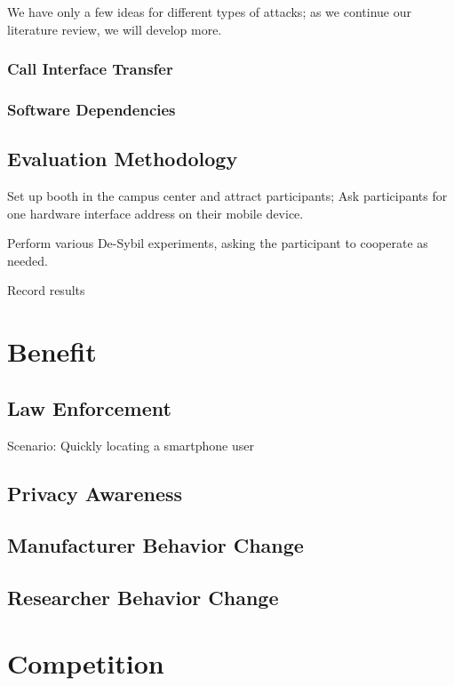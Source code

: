 \documentclass{article}
\begin{document}
			We have only a few ideas for different types of attacks; as we
			continue our literature review, we will develop more.
			\subsubsection{Call Interface Transfer}
			\subsubsection{Software Dependencies}
		\subsection{Evaluation Methodology}
			Set up booth in the campus center and attract participants; Ask
			participants for one hardware interface address on their mobile
			device.

			Perform various De-Sybil experiments, asking the participant to
			cooperate as needed.
			
			Record results %
	\section{Benefit}
		\subsection{Law Enforcement}
			Scenario: Quickly locating a smartphone user
		\subsection{Privacy Awareness}
		\subsection{Manufacturer Behavior Change}
		\subsection{Researcher Behavior Change}
	\section{Competition}
		
\end{document}
